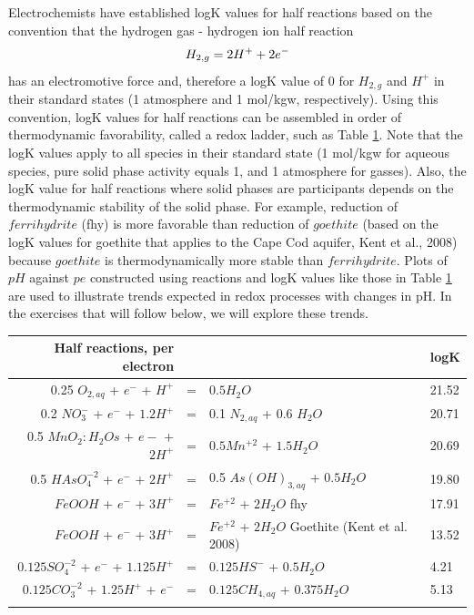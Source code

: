 Electrochemists have established logK values for 
half reactions based on the 
convention that the hydrogen gas -
hydrogen ion half reaction
\begin{equation}
H_{2,g}  =  2H^+ + 2e^- \\   
\label{eq:rdx9}
\end{equation} 
has an electromotive force and, therefore a logK 
value of 0 for $H_{2,g}$ and $H^+$ in their 
standard states (1 atmosphere and 1 mol/kgw, respectively).  
Using this convention, logK values for half reactions can be assembled 
in order of thermodynamic favorability, 
called a redox ladder, such as Table \ref{tab:rdx1}.  
Note that the logK values apply to all species in their standard state 
(1 mol/kgw for aqueous species, pure solid phase activity 
equals 1, and 1 atmosphere for gasses).  
Also, the logK value for half reactions where solid phases are participants 
depends on the thermodynamic stability of the solid phase.  
For example, reduction of $ferrihydrite$ (fhy) is more favorable than 
reduction of $goethite$ (based on the logK values for goethite that 
applies to the Cape Cod aquifer, Kent et al., 2008) because $goethite$ 
is thermodynamically more stable than $ferrihydrite$.  
Plots of $pH$ against $pe$ constructed using reactions and logK values like 
those in Table \ref{tab:rdx1} are used to illustrate 
trends expected in redox processes 
with changes in pH. In the exercises that will follow below, 
we will explore these trends.

\begin{table}[h]
\centering
\begin{tabular}{rcll}
\toprule
Half reactions, per electron				  & &									                  & logK \\ \hline
0.25 $O_{2,aq}$ + $e^-$ + $H^+$       &=& $0.5H_2O$											    & 21.52 \\
0.2  $NO_3^-$ + $e^-$ + $1.2H^+$      &=& 0.1 $N_{2,aq}$ + 0.6 $H_2O $      & 20.71 \\
0.5 $MnO_2:H_2Os$ + $e-$ + $2H^+$     &=& $0.5Mn^{+2}$ + $1.5H_2O$				  & 20.69 \\
0.5 $HAsO_4^{-2}$ + $e^-$ + $2H^+$    &=&  0.5 $As(OH)_{3,aq}$ +  $0.5H_2O$	      & 19.80 \\
$FeOOH$ + $e^-$ + $3H^+$              &=& $Fe^{+2}$ + $2H_2O$  fhy							    & 17.91 \\
$FeOOH$ + $e^-$ + $3H^+$              &=& $Fe^{+2}$ + $2H_2O$  Goethite (Kent et al. 2008)	    & 13.52 \\
$0.125SO_4^{-2}$ + $e^-$ + $1.125H^+$ &=& $0.125HS^-$ + $0.5H_2O$							    & 4.21 \\
$0.125CO_3^{-2}$ + $1.25H^+$ + $e^-$  &=& $0.125CH_{4,aq}$ + $0.375H_2O$						& 5.13 \\
\bottomrule
\label{tab:rdx1}
\end{tabular}
\end{table}	

